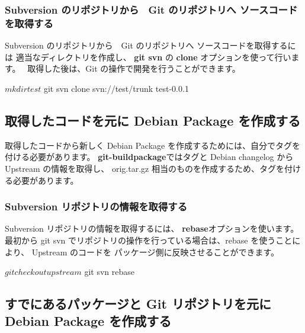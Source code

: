 \documentclass[mingoth,a4paper]{jsarticle}
\begin{document}
\subsubsection{Subversion のリポジトリから　Git のリポジトリへ ソースコードを取得する}
Subversion のリポジトリから　Git のリポジトリへ ソースコードを取得するには
適当なディレクトリを作成し、 {\bf git svn} の {\bf clone} オプションを使って行います。　
取得した後は、Git の操作で開発を行うことができます。

\begin{commandline}
$ mkdir test
$ git svn clone svn://test/trunk test-0.0.1
\end{commandline}

\subsection{取得したコードを元に Debian Package を作成する}
取得したコードから新しく Debian Package を作成するためには、自分でタグを付ける必要があります。
{\bf git-buildpackage}ではタグと Debian changelog から Upstream の情報を取得し、
orig.tar.gz 相当のものを作成するため、タグを付ける必要があります。



\subsubsection{Subversion リポジトリの情報を取得する}
Subversion リポジトリの情報を取得するには、 {\bf rebase}オプションを使います。
最初から git svn でリポジトリの操作を行っている場合は、rebase を使うことにより、
Upstream のコードを パッケージ側に反映させることができます。
\begin{commandline}
$ git checkout upstream
$ git svn rebase
\end{commandline}

\subsection{すでにあるパッケージと Git リポジトリを元に Debian Package を作成する}
\end{document}
